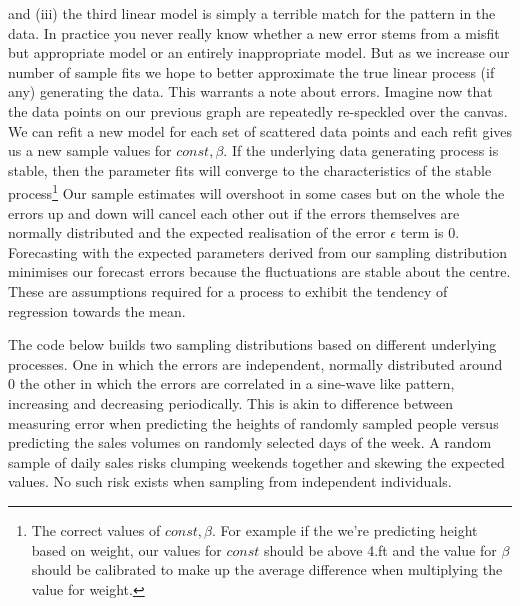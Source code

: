 \documentclass[10pt,a4paper,notitlepage, twocolumn]{article}
\begin{document}
and (iii) the third linear model is simply a terrible match for the pattern in the data. In practice you never really know whether a new error stems from a misfit but appropriate model or an entirely inappropriate model. But as we increase our number of sample fits we hope to better approximate the true linear process (if any) generating the data. This warrants a note about errors. Imagine now that the data points on our previous graph are repeatedly re-speckled over the canvas. We can refit a new model for each set of scattered data points and each refit gives us a new sample values for $ const, \beta$. If the underlying data generating process is stable, then the parameter fits will converge to the characteristics of the stable process\footnote{The correct values of $const, \beta$. For example if the we're predicting height based on weight, our values for $const$ should be above 4.ft and the value for $\beta$ should be calibrated to make up the average difference when multiplying the value for weight.} Our sample estimates will overshoot in some cases but on the whole the errors up and down will cancel each other out if the errors themselves are normally distributed and the expected realisation of the error $\epsilon$ term is 0. Forecasting with the expected parameters derived from our sampling distribution minimises our forecast errors because the fluctuations are stable about the centre. These are assumptions required for a process to exhibit the tendency of regression towards the mean. 

The code below builds two sampling distributions based on different underlying processes.  One in which the errors are independent, normally distributed around 0 the other in which the errors are correlated in a sine-wave like pattern, increasing and decreasing periodically. This is akin to difference between measuring error when predicting the heights of randomly sampled people versus predicting the sales volumes on randomly selected days of the week. A random sample of daily sales  risks clumping weekends together and skewing the expected values. No such risk exists when sampling from independent individuals. 
\end{document}
